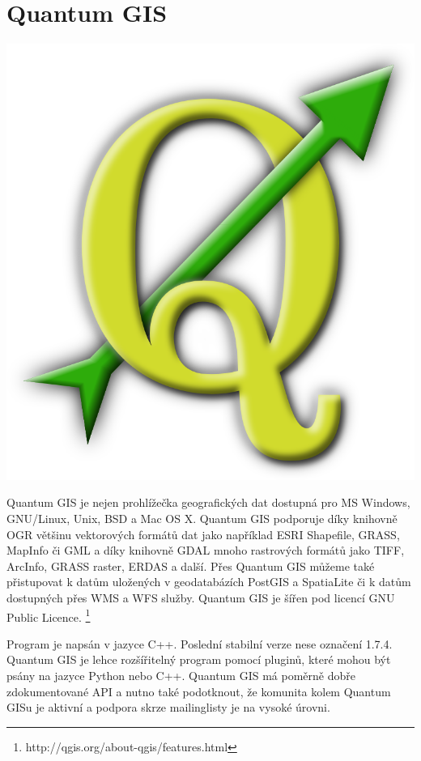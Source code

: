 \newpage
\section{Quantum GIS}

\nocite{qgis:www}

\begin{center}
	\includegraphics[scale=0.1]{pictures/qgis_logo}
\end{center}

Quantum GIS je nejen prohlížečka geografických dat dostupná pro MS Windows, GNU/Linux, Unix, BSD a Mac OS X. Quantum GIS podporuje díky knihovně OGR většinu vektorových formátů dat jako například ESRI Shapefile, GRASS, MapInfo či GML a díky knihovně  GDAL mnoho rastrových formátů jako TIFF, ArcInfo, GRASS raster, ERDAS a další. Přes Quantum GIS můžeme také přistupovat k datům uložených v geodatabázích PostGIS a SpatiaLite či k datům dostupných přes WMS a WFS služby. Quantum GIS je šířen pod licencí GNU Public Licence. \footnote{http://qgis.org/about-qgis/features.html}

Program je napsán v jazyce C++. Poslední stabilní verze nese označení 1.7.4. Quantum GIS je lehce rozšířitelný program pomocí pluginů, které mohou být psány na jazyce Python nebo C++. Quantum GIS má poměrně dobře zdokumentované API a nutno také podotknout, že komunita kolem Quantum GISu je aktivní a podpora skrze mailinglisty je na vysoké úrovni.

